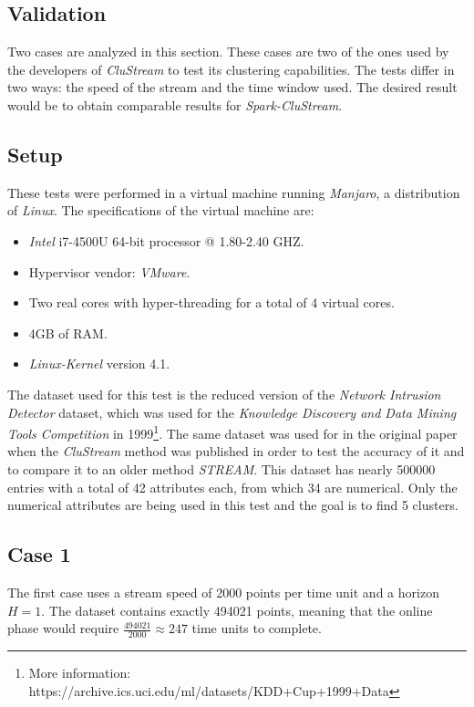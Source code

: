 \documentclass{llncs}
\begin{document}
\subsection{Validation}


Two cases are analyzed in this section. These cases are two of the ones used by the developers of \textit{CluStream} to test its clustering capabilities. The tests differ in two ways: the speed of the stream and the time window used. The desired result would be to obtain comparable results for \textit{Spark-CluStream}.

\subsection{Setup}

These tests were performed in a virtual machine running \textit{Manjaro}, a distribution of \textit{Linux}. The specifications of the virtual machine are:

\begin{itemize}
 \item \textit{Intel} i7-4500U 64-bit processor @ 1.80-2.40 GHZ.
 \item Hypervisor vendor: \textit{VMware}.
 \item Two real cores with hyper-threading for a total of 4 virtual cores.
 \item 4GB of RAM.
 \item \textit{Linux-Kernel} version 4.1.
\end{itemize}


The dataset used for this test is the reduced version of the \textit{Network Intrusion Detector} dataset, which was used for the \textit{Knowledge Discovery and Data Mining Tools Competition} in 1999\footnote{More information: https://archive.ics.uci.edu/ml/datasets/KDD+Cup+1999+Data}. The same dataset was used for in the original paper when the \textit{CluStream} method was published\cite{clustreamOrig} in order to test the accuracy of it and to compare it to an older method \textit{STREAM}. This dataset has nearly 500000 entries with a total of 42 attributes each, from which 34 are numerical. Only the numerical attributes are being used in this test and the goal is to find 5 clusters.

\subsection{Case 1}

The first case uses a stream speed of 2000 points per time unit and a horizon $H=1$. The dataset contains exactly 494021 points, meaning that the online phase would require $\frac{494021}{2000} \approx 247$ time units to complete.
\end{document}
